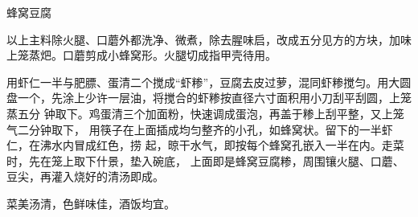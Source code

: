 \begin{recipe}{蜂窝豆腐}

\ingredients


\preparation

\step 以上主料除火腿、口蘑外都洗净、微煮，除去腥味启，改成五分见方的方块，加味
上笼蒸𤆵。口蘑剪成小蜂窝形。火腿切成指甲壳待用。

\step 用虾仁一半与肥膘、蛋清二个搅成“虾糁”，豆腐去皮过萝，混同虾糁搅匀。用大圆
盘一个，先涂上少许一层油，将搅合的虾糁按直径六寸面积用小刀刮平刮圆，上笼蒸五分
钟取下。鸡蛋清三个加面粉，快速调成蛋泡，再盖于糁上刮平整，又上笼气二分钟取下，
用筷子在上面插成均匀整齐的小孔，如蜂窝状。留下的一半虾仁，在沸水内冒成红色，捞
起，晾干水气，即按每个蜂窝孔嵌入一半在内。走菜时，先在笼上取下什景，垫入碗底，
上面即是蜂窝豆腐糁，周围镶火腿、口蘑、豆尖，再灌入烧好的清汤即成。

\features

菜美汤清，色鲜味佳，酒饭均宜。

\end{recipe}


